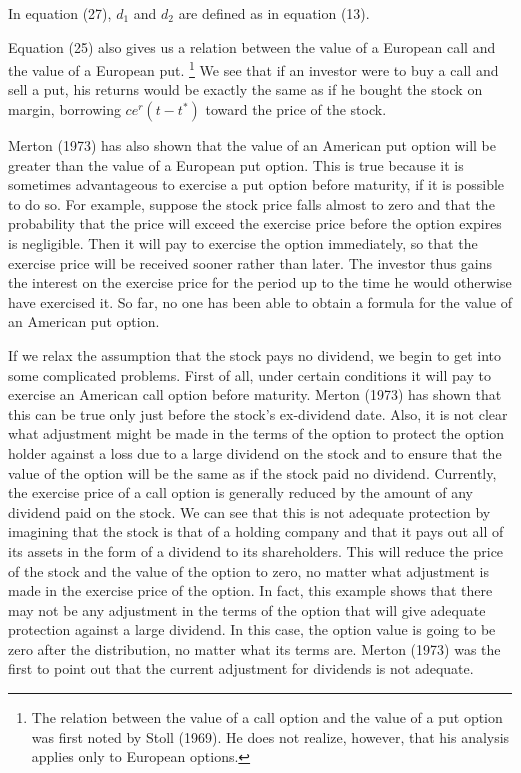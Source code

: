 \documentclass[a4paper, 12pt, twoside]{article}
\begin{document}
\noindent In equation (27), $d_1$ and $d_2$ are defined as in equation (13).

Equation (25) also gives us a relation between the value of a European call and the 
value of a European put. \footnote{\linespread{1}\fontsize{10}{10}\selectfont
The relation between the value of a call option and the value of a put 
option was first noted by Stoll (1969). He does not realize, however, that his 
analysis applies only to European options.
}
We see that if an investor were to buy a call and sell a put, 
his returns would be exactly the same as if he bought the stock on margin, borrowing 
$ce^r(t-t^*)$ toward the price of the stock.

Merton (1973) has also shown that the value of an American put option will be greater 
than the value of a European put option. This is true because it is sometimes 
advantageous to exercise a put option before maturity, if it is possible to do so. For 
example, suppose the stock price falls almost to zero and that the probability that 
the price will exceed the exercise price before the option expires is negligible. Then 
it will pay to exercise the option immediately, so that the exercise price will be 
received sooner rather than later. The investor thus gains the interest on the 
exercise price for the period up to the time he would otherwise have exercised it. So 
far, no one has been able to obtain a formula for the value of an American put option.

If we relax the assumption that the stock pays no dividend, we begin to get into some 
complicated problems. First of all, under certain conditions it will pay to exercise 
an American call option before maturity. Merton (1973) has shown that this can be true 
only just before the stock's ex-dividend date. Also, it is not clear what adjustment 
might be made in the terms of the option to protect the option holder against a loss 
due to a large dividend on the stock and to ensure that the value of the option will 
be the same as if the stock paid no dividend. Currently, the exercise price of a call 
option is generally reduced by the amount of any dividend paid on the stock. We can 
see that this is not adequate protection by imagining that the stock is that of a 
holding company and that it pays out all of its assets in the form of a dividend to 
its shareholders. This will reduce the price of the stock and the value of the option 
to zero, no matter what adjustment is made in the exercise price of the option. In 
fact, this example shows that there may not be any adjustment in the terms of the 
option that will give adequate protection against a large dividend. In this case, the 
option value is going to be zero after the distribution, no matter what its terms are. 
Merton (1973) was the first to point out that the current adjustment for dividends is 
not adequate.
\end{document}

